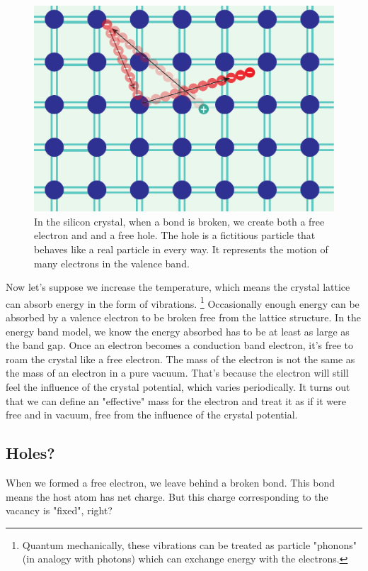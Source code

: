 \begin{figure}[tb]
\begin{center}
\includegraphics[width=.5\columnwidth]{silicon_broken_bond_motion}
\end{center}
\caption{In the silicon crystal, when a bond is broken, we create both a free electron and and a free hole.  The hole is a fictitious particle that behaves like a real particle in every way. It represents the motion of many electrons in the valence band. } \label{fig:silicon_broken_bond}
\end{figure}


Now let's suppose we increase the temperature, which means the crystal lattice can absorb energy in the form of vibrations.  \footnote{Quantum mechanically, these vibrations can be treated as particle "phonons" (in analogy with photons) which can exchange energy with the electrons.}  Occasionally enough energy can be absorbed by a valence electron to be broken free from the lattice structure.  In the energy band model, we know the energy absorbed has to be at least as large as the band gap.  Once an electron becomes a conduction band electron, it's free to roam the crystal like a free electron.  The mass of the electron is not the same as the mass of an electron in a pure vacuum.  That's because the electron will still feel the influence of the crystal potential, which varies periodically.  It turns out that we can define an "effective" mass for the electron and treat it as if it were free and in vacuum, free from the influence of the crystal potential. 




\subsection{Holes?}


When we formed a free electron, we leave behind a broken bond.  This bond means the host atom has net charge.  But this charge corresponding to the vacancy is "fixed", right?


